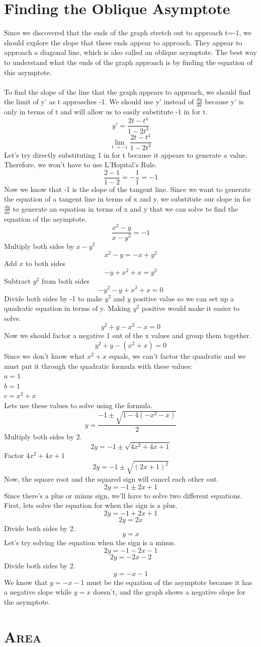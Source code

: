 \documentclass[a4paper,openright, 10pt]{article}
\newcommand{\ssection}[1]{%
\section[#1]{\centering\normalfont\scshape #1}}
\begin{document}
\section*{Finding the Oblique Asymptote}
Since we discovered that the ends of the graph stretch out to approach t=-1, we should explore the slope that these ends appear to approach. They appear to approach a diagonal line, which is also called an oblique asymptote. The best way to understand what the ends of the graph approach is by finding the equation of this asymptote.\\\\
To find the slope of the line that the graph appears to approach, we should find the limit of y' as t approaches -1. We should use y' instead of $\frac{dy}{dx}$ because y' is only in terms of t and will allow us to easily substitute -1 in for t.
$$y'=\frac{2t-t^4}{1-2t^3}$$
$$\lim_{t\to-1}\frac{2t-t^4}{1-2t^3}$$
Let's try directly substituting 1 in for t because it appears to generate a value. Therefore, we won't have to use L'Hopital's Rule.
$$\frac{2-1}{1-2}=-\frac{1}{1}=-1$$
Now we know that -1 is the slope of the tangent line. Since we want to generate the equation of a tangent line in terms of x and y, we substitute our slope in for $\frac{dy}{dx}$ to generate an equation in terms of x and y that we can solve to find the equation of the asymptote.
$$\frac{x^2-y}{x-y^2}=-1$$
Multiply both sides by $x-y^2$
$$x^2-y=-x+y^2$$
Add $x$ to both sides
$$-y+x^2+x=y^2$$
Subtract $y^2$ from both sides
$$-y^2-y+x^2+x=0$$
Divide both sides by -1 to make $y^2$ and $y$ positive value so we can set up a quadratic equation in terms of y. Making $y^2$ positive would make it easier to solve.
$$y^2+y-x^2-x=0$$
Now we should factor a negative 1 out of the x values and group them together. 
$$y^2+y-(x^2+x)=0$$
Since we don't know what $x^2+x$ equals, we can't factor the quadratic and we must put it through the quadratic formula with these values:\\
$a=1$\\
$b=1$\\
$c=x^2+x$\\
Lets use these values to solve using the formula.
$$y=\frac{-1\pm \sqrt{1-4(-x^2-x)}}{2}$$
Multiply both sides by 2.
$$2y=-1\pm \sqrt{4x^2+4x+1}$$
Factor $4x^2+4x+1$
$$2y=-1\pm \sqrt{(2x+1)^2}$$
Now, the square root and the squared sign will cancel each other out.
$$2y=-1\pm 2x+1$$
Since there's a plus or minus sign, we'll have to solve two different equations. First, lets solve the equation for when the sign is a plus.
$$2y=-1+2x+1$$
$$2y=2x$$
Divide both sides by 2.
$$y=x$$
Let's try solving the equation when the sign is a minus.
$$2y=-1-2x-1$$
$$2y=-2x-2$$
Divide both sides by 2.
$$y=-x-1$$
We know that $y=-x-1$ must be the equation of the asymptote because it has a negative slope while $y=x$ doesn't, and the graph shows a negative slope for the asymptote.
\ssection{Area}
\end{document}
